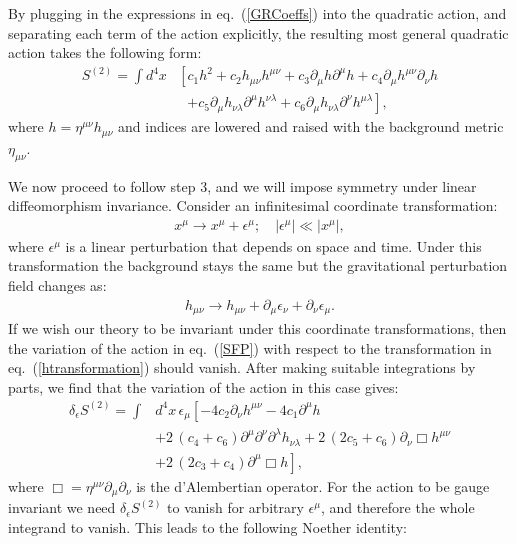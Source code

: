 \documentclass[10pt,twocolumn,preprintnumbers,amsmath,amssymb,nofootinbib
,superscriptaddress]{revtex4-1}
\begin{document}
By plugging in the expressions in eq.~(\ref{GRCoeffs}) into the quadratic action, and separating each term of the action explicitly, the resulting most general quadratic action takes the following form:
\begin{align}
 S^{(2)}= \int d^4x&\left[ c_1h^2+c_2h_{\mu\nu}h^{\mu\nu}+c_3\partial_\mu h \partial^\mu h +c_4 \partial_\mu h^{\mu\nu}\partial_\nu h \right.\nonumber \\ & \ \ \ \left.+c_5\partial_\mu h_{\nu\lambda}\partial^\mu h^{\nu\lambda}+c_6\partial_\mu h_{\nu\lambda}\partial^\nu h^{\mu\lambda}\right], \label{SFP}
\end{align}
where $h=\eta^{\mu\nu}h_{\mu\nu}$ and indices are lowered and raised with the background metric $\eta_{\mu\nu}$.

We now proceed to follow step 3, and we will impose symmetry under linear diffeomorphism invariance. Consider an infinitesimal coordinate transformation:
\begin{align}
 x^{\mu}\rightarrow x^\mu + \epsilon^\mu;\quad |\epsilon^\mu | \ll | x^\mu|, \label{coordtransformation}
\end{align}
where $\epsilon^\mu$ is a linear perturbation that depends on space and time. Under this transformation the background stays the same but the gravitational perturbation field changes as:
\begin{align}
 h_{\mu\nu}\rightarrow h_{\mu\nu}+\partial_\mu\epsilon_\nu+\partial_\nu\epsilon_\mu. \label{htransformation}
\end{align}
If we wish our theory to be invariant under this coordinate transformations, then the variation of the action in eq.~(\ref{SFP}) with respect to the transformation in eq.~(\ref{htransformation}) should vanish. After making suitable integrations by parts, we find that the variation of the action in this case gives:
\begin{align}
 \delta_\epsilon S^{(2)}=\int &d^4x\,\epsilon_\mu \left[-4c_2\partial_\nu h^{\mu\nu}-4c_1\partial^\mu h\right. \nonumber \\&+ 2\, (c_4+c_6)\partial^\mu\partial^\nu\partial^\lambda h_{\nu\lambda} +2\, (2c_5+c_6)\partial_\nu\Box h^{\mu\nu} \nonumber\\
 &\left.+2\, (2c_3+c_4)\partial^\mu\Box h\right], \label{deltaSFP}
\end{align}
where $\Box=\eta^{\mu\nu}\partial_\mu\partial_\nu$ is the d'Alembertian operator. For the action to be gauge invariant we need $\delta_\epsilon S^{(2)}$ to vanish for arbitrary $\epsilon^\mu$, and therefore the whole integrand to vanish. This leads to the following Noether identity:
\end{document}
